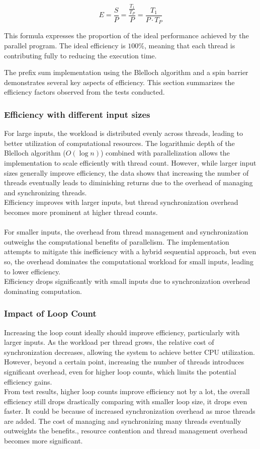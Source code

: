 \documentclass[letterpaper,12pt]{article}
\theoremstyle{remark}
\begin{document}
   $$E = \frac{S}{P} = \frac{\frac{T_1}{T_P}}{P} = \frac{T_1}{P \cdot T_P}$$

  

This formula expresses the proportion of the ideal performance achieved by the parallel program. The ideal efficiency is $100\%$, meaning that each thread is contributing fully to reducing the execution time.

The prefix sum implementation using the Blelloch algorithm and a spin barrier demonstrates several key aspects of efficiency. This section summarizes the efficiency factors observed from the tests conducted.

\subsubsection{Efficiency with different input sizes}
For large inputs, the workload is distributed evenly across threads, leading to better utilization of computational resources. The logarithmic depth of the Blelloch algorithm (\( O(\log n) \)) combined with parallelization allows the implementation to scale efficiently with thread count. However, while larger input sizes generally improve efficiency, the data shows that increasing the number of threads eventually leads to diminishing returns due to the overhead of managing and synchronizing threads.\\
Efficiency improves with larger inputs, but thread synchronization overhead becomes more prominent at higher thread counts.\\\\
For smaller inputs, the overhead from thread management and synchronization outweighs the computational benefits of parallelism. The implementation attempts to mitigate this inefficiency with a hybrid sequential approach, but even so, the overhead dominates the computational workload for small inputs, leading to lower efficiency.\\
Efficiency drops significantly with small inputs due to synchronization overhead dominating computation.

\subsubsection{Impact of Loop Count}
Increasing the loop count ideally should improve efficiency, particularly with larger inputs. As the workload per thread grows, the relative cost of synchronization decreases, allowing the system to achieve better CPU utilization. However, beyond a certain point, increasing the number of threads introduces significant overhead, even for higher loop counts, which limits the potential efficiency gains.\\
From test results, higher loop counts improve efficiency not by a lot, the overall efficiency still drops drastically comparing with smaller loop size, it drops even faster. It could be because of increased synchronization overhead as mroe threads are added. The cost of managing and synchronizing many threads eventually outweights the benefits., resource contention and thread management overhead becomes more significant.
\end{document}
